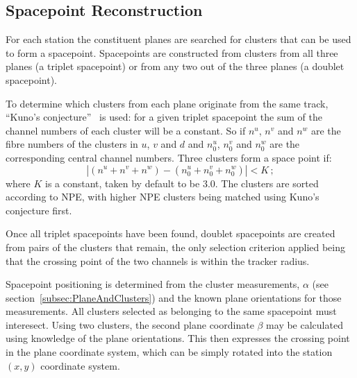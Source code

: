   \subsection{Spacepoint Reconstruction}
  \label{subsec:SpacepointReconstruction}
  For each station the constituent planes are searched for clusters that can be used to form a spacepoint. Spacepoints are constructed from clusters from all three planes (a triplet spacepoint) or from any two out of the three planes (a doublet spacepoint). 

  To determine which clusters from each plane originate from the same track, ``Kuno's conjecture''~\cite{TrackersNIM} is used: for a given triplet spacepoint the sum of the channel numbers of each cluster will be a constant.  So if $n^u$, $n^v$ and $n^w$ are the fibre numbers of the clusters in $u$, $v$ and $d$ and $n^u_0$, $n^v_0$ and $n^w_0$ are the corresponding central channel numbers. Three clusters form a space point if:
  \begin{equation}
    | (n^u + n^v + n^w) - (n^u_0 + n^v_0 + n^w_0) | < K \, ;
  \end{equation}
  where $K$ is a constant, taken by default to be 3.0. The clusters are sorted according to NPE, with higher NPE clusters being matched using Kuno's conjecture first. 
  
  Once all triplet spacepoints have been found, doublet spacepoints are created from pairs of the clusters that remain, the only selection criterion applied being that the crossing point of the two channels is within the tracker radius. 

  Spacepoint positioning is determined from the cluster measurements, $\alpha$ (see section~\ref{subsec:PlaneAndClusters}) and the known plane orientations for those measurements. All clusters selected as belonging to the same spacepoint must interesect. Using two clusters, the second plane coordinate $\beta$ may be calculated using knowledge of the plane orientations. This then expresses the crossing point in the plane coordinate system, which can be simply rotated into the station $(x, y)$ coordinate system. %


%   

